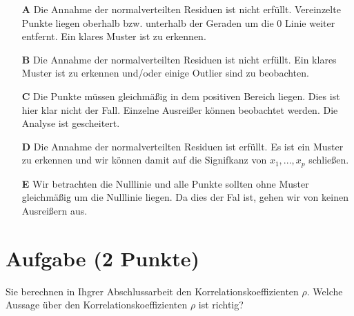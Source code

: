 \documentclass[a4paper, 9pt]{scrartcl}\usepackage[]{graphicx}\usepackage[]{xcolor}
\begin{document}
\begin{enumerate}
\item [\textbf{A} \msquare] Die Annahme der normalverteilten Residuen ist nicht erfüllt. Vereinzelte Punkte liegen oberhalb bzw. unterhalb der Geraden um die 0 Linie weiter entfernt. Ein klares Muster ist zu erkennen.
\item [\textbf{B} \msquare] Die Annahme der normalverteilten Residuen ist nicht erfüllt. Ein klares Muster ist zu erkennen und/oder einige Outlier sind zu beobachten.
\item [\textbf{C} \msquare] Die Punkte müssen gleichmäßig in dem positiven Bereich liegen. Dies ist hier klar nicht der Fall. Einzelne Ausreißer können beobachtet werden. Die Analyse ist gescheitert.
\item [\textbf{D} \msquare] Die Annahme der normalverteilten Residuen ist erfüllt. Es ist ein Muster zu erkennen und wir können damit auf die Signifkanz von $x_1, ..., x_p$ schließen.
\item [\textbf{E} \msquare] Wir betrachten die Nulllinie und alle Punkte sollten ohne Muster gleichmäßig um die Nulllinie liegen. Da dies der Fal ist, gehen wir von keinen Ausreißern aus.
\end{enumerate}

\section{Aufgabe \hfill (2 Punkte)}




Sie berechnen in Ihgrer Abschlussarbeit den Korrelationskoeffizienten $\rho$. Welche Aussage über den Korrelationskoeffizienten $\rho$ ist richtig?
\end{document}
